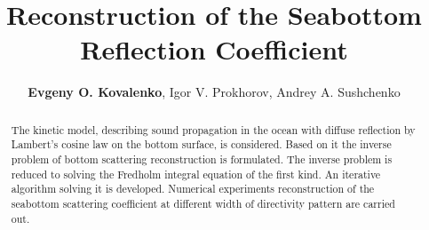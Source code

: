 \documentclass{procDDs}
\title{Reconstruction of the Seabottom Reflection Coefficient}
\author{\textbf{Evgeny O. Kovalenko}, Igor V. Prokhorov, Andrey A. Sushchenko}%
{Institute for Applied Mathematics, FEB RAS, Vladivostok, Russia, \\ 
Far Eastern Federal University, Vladivostok, Russia}                 %
{kovalenko.eo@dvfu.ru, sushchenko.aa@dvfu.ru}                                   %
\begin{document}
\maketitle

\def\k{\mathbf{k}}
\def\n{\mathbf{n}}
\def\x{\mathbf{x}}
\def\y{\mathbf{y}}
\def\r{\mathbf{r}}
\def\p{\mathbf{|}}
\def\z{\mathbf{z}}
\def\V{\mathbf{V}}
\def\Vt{\mathbf{V}t}
\def\exp{\text{exp}}

\begin{abstract}
   The kinetic model, describing sound propagation in the ocean with diffuse reflection by Lambert's cosine law on the bottom surface, is considered. Based on it the inverse problem of bottom scattering reconstruction is formulated.
	The inverse problem is reduced to solving the Fredholm integral equation of the first kind. An iterative algorithm solving it is developed. Numerical experiments reconstruction of the seabottom scattering coefficient at different width of directivity pattern are carried out.
\end{abstract}
\end{document}
